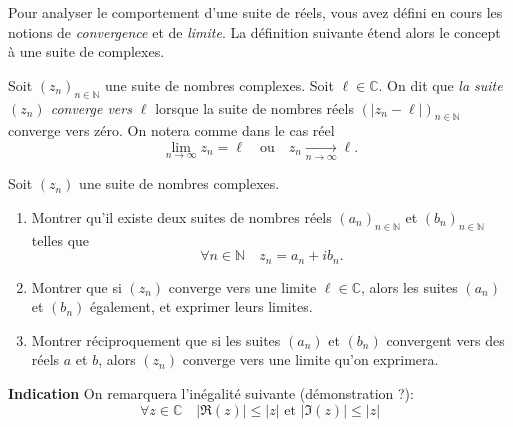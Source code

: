 \documentclass[12pt]{article}
\newcommand{\CC}{\mathbb C}
\newcommand{\NN}{\mathbb N}
\theoremstyle{definition}
\theoremstyle{theorem}
\begin{document}
Pour analyser le comportement d'une suite de réels, vous avez défini en cours les notions de \textit{convergence} et de \textit{limite}. La définition suivante étend alors le concept à une suite de complexes.

\begin{defn}
Soit $(z_n)_{n\in\NN}$ une suite de nombres complexes. Soit $\ell \in\CC$. On dit que \textit{la suite $(z_n)$ converge vers $\ell$} lorsque la suite de nombres réels
$\left(
|z_n -\ell|\right)_{n\in\NN}
$
converge vers zéro. On notera comme dans le cas réel
\[
\lim_{n\to\infty}z_n = \ell \quad\text{ou}\quad z_n \xrightarrow[n\to\infty]{}\ell.
\]
\end{defn}

\begin{exer}
Soit $(z_n)$ une suite de nombres complexes.\begin{enumerate}
	\item Montrer qu'il existe deux suites de nombres réels $(a_n)_{n\in\NN}$ et $(b_n)_{n\in\NN}$ telles que
	\[
	\forall n\in\NN \quad z_n = a_n + ib_n.
	\]
	\item Montrer que si $(z_n)$ converge vers une limite $\ell\in\CC$, alors les suites $(a_n)$ et $(b_n)$ également, et exprimer leurs limites.
	\item Montrer réciproquement que si les suites $(a_n)$ et $(b_n)$ convergent vers des réels $a$ et $b$, alors $(z_n)$ converge vers une limite qu'on exprimera.
\end{enumerate} 
\noindent\textbf{Indication} On remarquera l'inégalité suivante (démonstration ?):
\[
\forall z\in\CC \quad |\Re(z)| \leq |z|\text{ et }|\Im(z)| \leq |z|
\]
\end{exer}
\end{document}
